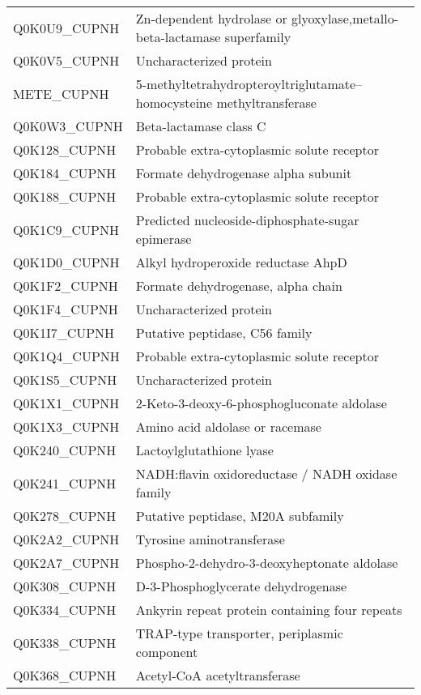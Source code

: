 \begin{center}
\begin{longtable}{ l l }
Q0K0U9\_CUPNH & Zn-dependent hydrolase or glyoxylase,metallo-beta-lactamase superfamily \\ [0.5ex]
Q0K0V5\_CUPNH & Uncharacterized protein \\ [0.5ex]
METE\_CUPNH & 5-methyltetrahydropteroyltriglutamate--homocysteine methyltransferase \\ [0.5ex]
Q0K0W3\_CUPNH & Beta-lactamase class C \\ [0.5ex]
Q0K128\_CUPNH & Probable extra-cytoplasmic solute receptor \\ [0.5ex]
Q0K184\_CUPNH & Formate dehydrogenase alpha subunit \\ [0.5ex]
Q0K188\_CUPNH & Probable extra-cytoplasmic solute receptor \\ [0.5ex]
Q0K1C9\_CUPNH & Predicted nucleoside-diphosphate-sugar epimerase \\ [0.5ex]
Q0K1D0\_CUPNH & Alkyl hydroperoxide reductase AhpD \\ [0.5ex]
Q0K1F2\_CUPNH & Formate dehydrogenase, alpha chain \\ [0.5ex]
Q0K1F4\_CUPNH & Uncharacterized protein \\ [0.5ex]
Q0K1I7\_CUPNH & Putative peptidase, C56 family \\ [0.5ex]
Q0K1Q4\_CUPNH & Probable extra-cytoplasmic solute receptor \\ [0.5ex]
Q0K1S5\_CUPNH & Uncharacterized protein \\ [0.5ex]
Q0K1X1\_CUPNH & 2-Keto-3-deoxy-6-phosphogluconate aldolase \\ [0.5ex]
Q0K1X3\_CUPNH & Amino acid aldolase or racemase \\ [0.5ex]
Q0K240\_CUPNH & Lactoylglutathione lyase \\ [0.5ex]
Q0K241\_CUPNH & NADH:flavin oxidoreductase / NADH oxidase family \\ [0.5ex]
Q0K278\_CUPNH & Putative peptidase, M20A subfamily \\ [0.5ex]
Q0K2A2\_CUPNH & Tyrosine aminotransferase \\ [0.5ex]
Q0K2A7\_CUPNH & Phospho-2-dehydro-3-deoxyheptonate aldolase \\ [0.5ex]
Q0K308\_CUPNH & D-3-Phosphoglycerate dehydrogenase \\ [0.5ex]
Q0K334\_CUPNH & Ankyrin repeat protein containing four repeats \\ [0.5ex]
Q0K338\_CUPNH & TRAP-type transporter, periplasmic component \\ [0.5ex]
Q0K368\_CUPNH & Acetyl-CoA acetyltransferase \\ [0.5ex]

\end{longtable}
\end{center}
